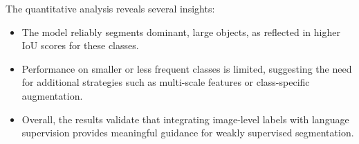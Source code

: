 The quantitative analysis reveals several insights:
\begin{itemize}
    \item The model reliably segments dominant, large objects, as reflected in higher IoU scores for these classes.
    \item Performance on smaller or less frequent classes is limited, suggesting the need for additional strategies such as multi-scale features or class-specific augmentation.
    \item Overall, the results validate that integrating image-level labels with language supervision provides meaningful guidance for weakly supervised segmentation.
\end{itemize}

